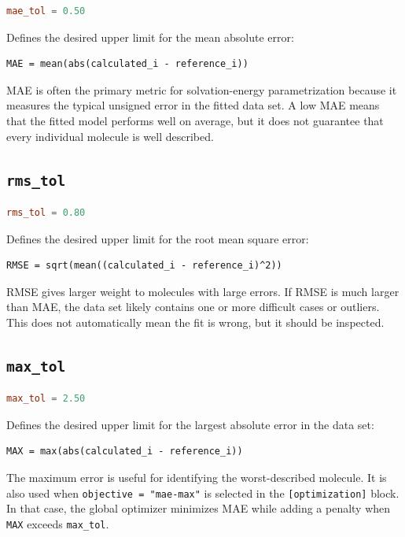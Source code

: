 \documentclass[11pt]{article}
\begin{document}
\begin{lstlisting}[language=toml]
mae_tol = 0.50
\end{lstlisting}

Defines the desired upper limit for the mean absolute error:

\begin{lstlisting}
MAE = mean(abs(calculated_i - reference_i))
\end{lstlisting}

MAE is often the primary metric for solvation-energy parametrization because it
measures the typical unsigned error in the fitted data set. A low MAE means that
the fitted model performs well on average, but it does not guarantee that every
individual molecule is well described.

\subsection{\texttt{rms\_tol}}

\begin{lstlisting}[language=toml]
rms_tol = 0.80
\end{lstlisting}

Defines the desired upper limit for the root mean square error:

\begin{lstlisting}
RMSE = sqrt(mean((calculated_i - reference_i)^2))
\end{lstlisting}

RMSE gives larger weight to molecules with large errors. If RMSE is much larger
than MAE, the data set likely contains one or more difficult cases or outliers.
This does not automatically mean the fit is wrong, but it should be inspected.

\subsection{\texttt{max\_tol}}

\begin{lstlisting}[language=toml]
max_tol = 2.50
\end{lstlisting}

Defines the desired upper limit for the largest absolute error in the data set:

\begin{lstlisting}
MAX = max(abs(calculated_i - reference_i))
\end{lstlisting}

The maximum error is useful for identifying the worst-described molecule. It is
also used when \texttt{objective = "mae-max"} is selected in the
\texttt{[optimization]} block. In that case, the global optimizer minimizes MAE
while adding a penalty when \texttt{MAX} exceeds \texttt{max\_tol}.
\end{document}
